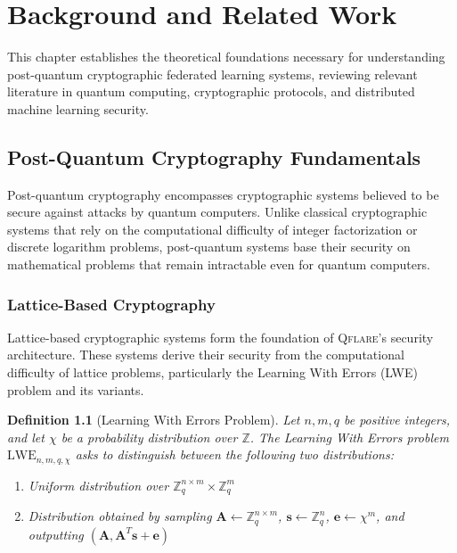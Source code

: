 \documentclass[12pt,a4paper,twoside]{book}
\newcommand{\qflare}{\textsc{Qflare}}
\newtheorem{definition}[theorem]{Definition}
\begin{document}
\chapter{Background and Related Work}
\label{ch:background}

This chapter establishes the theoretical foundations necessary for understanding post-quantum cryptographic federated learning systems, reviewing relevant literature in quantum computing, cryptographic protocols, and distributed machine learning security.

\section{Post-Quantum Cryptography Fundamentals}
\label{sec:pqc-fundamentals}

Post-quantum cryptography encompasses cryptographic systems believed to be secure against attacks by quantum computers. Unlike classical cryptographic systems that rely on the computational difficulty of integer factorization or discrete logarithm problems, post-quantum systems base their security on mathematical problems that remain intractable even for quantum computers.

\subsection{Lattice-Based Cryptography}
\label{subsec:lattice-crypto}

Lattice-based cryptographic systems form the foundation of \qflare{}'s security architecture. These systems derive their security from the computational difficulty of lattice problems, particularly the Learning With Errors (LWE) problem and its variants.

\begin{definition}[Learning With Errors Problem]
\label{def:lwe}
Let $n, m, q$ be positive integers, and let $\chi$ be a probability distribution over $\mathbb{Z}$. The Learning With Errors problem $\text{LWE}_{n,m,q,\chi}$ asks to distinguish between the following two distributions:
\begin{enumerate}
\item Uniform distribution over $\mathbb{Z}_q^{n \times m} \times \mathbb{Z}_q^m$
\item Distribution obtained by sampling $\mathbf{A} \leftarrow \mathbb{Z}_q^{n \times m}$, $\mathbf{s} \leftarrow \mathbb{Z}_q^n$, $\mathbf{e} \leftarrow \chi^m$, and outputting $(\mathbf{A}, \mathbf{A}^T\mathbf{s} + \mathbf{e})$
\end{enumerate}
\end{definition}
\end{document}
